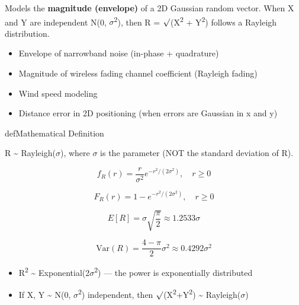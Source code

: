

Models the \textbf{magnitude (envelope)} of a 2D Gaussian random vector. When X and Y are independent N(0, \ensuremath{\sigma}\textsuperscript{2}), then R = \ensuremath{\surd}(X\textsuperscript{2} + Y\textsuperscript{2}) follows a Rayleigh distribution.


\begin{itemize}
\tightlist
\item
  Envelope of narrowband noise (in-phase + quadrature)
\item
  Magnitude of wireless fading channel coefficient (Rayleigh fading)
\item
  Wind speed modeling
\item
  Distance error in 2D positioning (when errors are Gaussian in x and y)
\end{itemize}

\begin{PSbox}[unbreakable]{def}{Mathematical Definition}

R \textasciitilde{} Rayleigh(\ensuremath{\sigma}), where \ensuremath{\sigma} is the parameter (NOT the standard deviation of R).

\end{PSbox}


\[f_R(r) = \frac{r}{\sigma^2} e^{-r^2/(2\sigma^2)}, \quad r \geq 0\]


\[F_R(r) = 1 - e^{-r^2/(2\sigma^2)}, \quad r \geq 0\]


\[E[R] = \sigma\sqrt{\frac{\pi}{2}} \approx 1.2533\sigma\]


\[\text{Var}(R) = \frac{4-\pi}{2}\sigma^2 \approx 0.4292\sigma^2\]


\begin{itemize}
\tightlist
\item
  R\textsuperscript{2} \textasciitilde{} Exponential(2\ensuremath{\sigma}\textsuperscript{2}) — the power is exponentially distributed
\item
  If X, Y \textasciitilde{} N(0, \ensuremath{\sigma}\textsuperscript{2}) independent, then \ensuremath{\surd}(X\textsuperscript{2}+Y\textsuperscript{2}) \textasciitilde{} Rayleigh(\ensuremath{\sigma})
\end{itemize}

